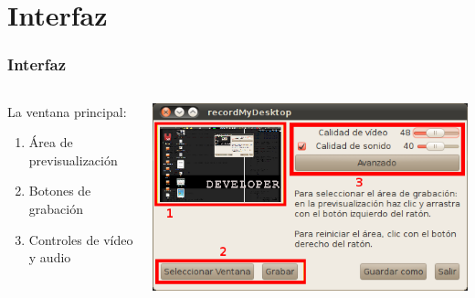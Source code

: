\documentclass{beamer}
\begin{document}
	\section{Interfaz}
		\begin{frame}
			\frametitle{Interfaz}
			\begin{columns}
				\begin{column}[l]{5cm}
					La ventana principal:
					\begin{enumerate}
						\item Área de previsualización
						\item Botones de grabación
						\item Controles de vídeo y audio
					\end{enumerate}
				\end{column}
				\begin{column}[r]{5cm}
					\includegraphics[height=0.4\textheight, keepaspectratio=true]{Imagenes/Interfaz/01.png}
				\end{column}
			\end{columns}
		\end{frame}
\end{document}
